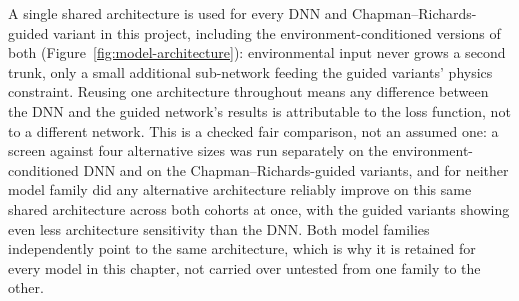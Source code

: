 \documentclass[11pt,a4paper]{report}
\begin{document}
A single shared architecture is used for every DNN and Chapman--Richards-guided variant in this
project, including the environment-conditioned versions of both (Figure~\ref{fig:model-architecture}):
environmental input never grows a second trunk, only a small additional sub-network feeding the
guided variants' physics constraint. Reusing one architecture throughout means any difference
between the DNN and the guided network's results is attributable to the loss function, not to a
different network. This is a checked fair comparison, not an assumed one: a screen against four
alternative sizes was run separately on the environment-conditioned DNN and on the
Chapman--Richards-guided variants, and for neither model family did any alternative architecture
reliably improve on this same shared architecture across both cohorts at once, with the guided
variants showing even less architecture sensitivity than the DNN. Both model families
independently point to the same architecture, which is why it is retained for every model in this
chapter, not carried over untested from one family to the other.
\end{document}
